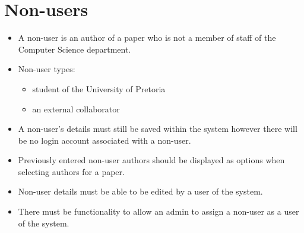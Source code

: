 \documentclass{article}
\begin{document}
\cleardoublepage
\section{Non-users}\label{sec:non-users}
	\begin{itemize}
		\item A non-user is an author of a paper who is not a member of staff of the Computer Science department.
		\item Non-user types:
		\begin{itemize}
			\item student of the University of Pretoria
			\item an external collaborator
		\end{itemize}
		\item A non-user's details must still be saved within the system however there will be no login account associated with a non-user.
		\item Previously entered non-user authors should be displayed as options when selecting authors for a paper.
		\item Non-user details must be able to be edited by a user of the system.
		\item There must be functionality to allow an admin to assign a non-user as a user of the system.
	\end{itemize}
\end{document}
